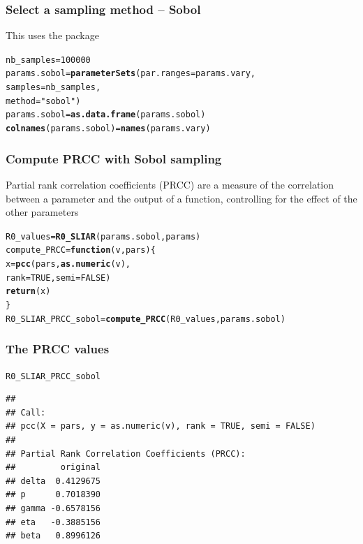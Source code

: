 \documentclass[aspectratio=169]{beamer}\usepackage[]{graphicx}\usepackage[]{xcolor}
\makeatletter
\newcommand{\hlnum}[1]{\textcolor[rgb]{0.686,0.059,0.569}{#1}}%
\newcommand{\hlsng}[1]{\textcolor[rgb]{0.192,0.494,0.8}{#1}}%
\newcommand{\hldef}[1]{\textcolor[rgb]{0.345,0.345,0.345}{#1}}%
\newcommand{\hlkwa}[1]{\textcolor[rgb]{0.161,0.373,0.58}{\textbf{#1}}}%
\newcommand{\hlkwb}[1]{\textcolor[rgb]{0.69,0.353,0.396}{#1}}%
\newcommand{\hlkwc}[1]{\textcolor[rgb]{0.333,0.667,0.333}{#1}}%
\newcommand{\hlkwd}[1]{\textcolor[rgb]{0.737,0.353,0.396}{\textbf{#1}}}%
\newenvironment{kframe}{%
 \def\at@end@of@kframe{}%
 \ifinner\ifhmode%
  \def\at@end@of@kframe{\end{minipage}}%
  \begin{minipage}{\columnwidth}%
 \fi\fi%
 \def\FrameCommand##1{\hskip\@totalleftmargin \hskip-\fboxsep
 \colorbox{shadecolor}{##1}\hskip-\fboxsep
     \hskip-\linewidth \hskip-\@totalleftmargin \hskip\columnwidth}%
 \MakeFramed {\advance\hsize-\width
   \@totalleftmargin\z@ \linewidth\hsize
   \@setminipage}}%
 {\par\unskip\endMakeFramed%
 \at@end@of@kframe}
\newenvironment{knitrout}{}{} %
\makeatother
\begin{document}
\begin{frame}[fragile]\frametitle{Select a sampling method -- Sobol}
This uses the  package
\vfill
\begin{knitrout}
\color{fgcolor}\begin{kframe}
\begin{alltt}
\hldef{nb_samples} \hlkwb{=} \hlnum{100000}
\hldef{params.sobol} \hlkwb{=} \hlkwd{parameterSets}\hldef{(}\hlkwc{par.ranges} \hldef{= params.vary,}
                             \hlkwc{samples} \hldef{= nb_samples,}
                             \hlkwc{method} \hldef{=} \hlsng{"sobol"}\hldef{)}
\hldef{params.sobol} \hlkwb{=} \hlkwd{as.data.frame}\hldef{(params.sobol)}
\hlkwd{colnames}\hldef{(params.sobol)} \hlkwb{=} \hlkwd{names}\hldef{(params.vary)}
\end{alltt}
\end{kframe}
\end{knitrout}
\end{frame}

\begin{frame}[fragile]\frametitle{Compute PRCC with Sobol sampling}
Partial rank correlation coefficients (PRCC) are a measure of the correlation between a parameter and the output of a function, controlling for the effect of the other parameters
\vfill
\begin{knitrout}
\color{fgcolor}\begin{kframe}
\begin{alltt}
\hldef{R0_values} \hlkwb{=} \hlkwd{R0_SLIAR}\hldef{(params.sobol, params)}
\hldef{compute_PRCC} \hlkwb{=} \hlkwa{function}\hldef{(}\hlkwc{v}\hldef{,} \hlkwc{pars}\hldef{) \{}
  \hldef{x} \hlkwb{=} \hlkwd{pcc}\hldef{(pars,} \hlkwd{as.numeric}\hldef{(v),}
          \hlkwc{rank} \hldef{=} \hlnum{TRUE}\hldef{,} \hlkwc{semi} \hldef{=} \hlnum{FALSE}\hldef{)}
  \hlkwd{return}\hldef{(x)}
\hldef{\}}
\hldef{R0_SLIAR_PRCC_sobol} \hlkwb{=} \hlkwd{compute_PRCC}\hldef{(R0_values, params.sobol)}
\end{alltt}
\end{kframe}
\end{knitrout}
\end{frame}

\begin{frame}[fragile]\frametitle{The PRCC values}
\begin{knitrout}
\color{fgcolor}\begin{kframe}
\begin{alltt}
\hldef{R0_SLIAR_PRCC_sobol}
\end{alltt}
\begin{verbatim}
## 
## Call:
## pcc(X = pars, y = as.numeric(v), rank = TRUE, semi = FALSE)
## 
## Partial Rank Correlation Coefficients (PRCC):
##         original
## delta  0.4129675
## p      0.7018390
## gamma -0.6578156
## eta   -0.3885156
## beta   0.8996126
\end{verbatim}
\end{kframe}
\end{knitrout}
\end{frame}
\end{document}

